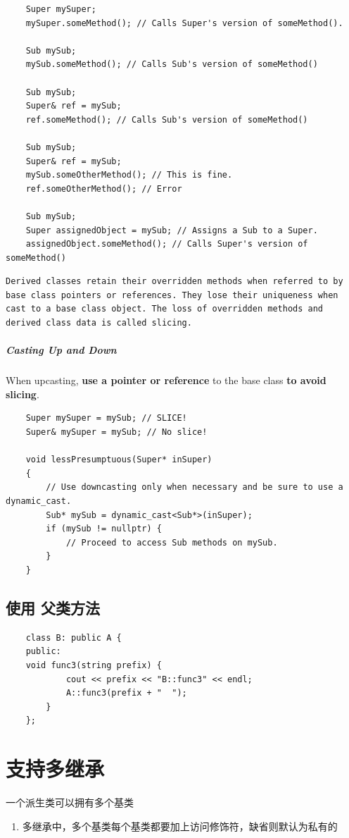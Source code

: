 \documentclass[UTF8,a4paper,12pt]{ctexbook} %
\begin{document}
			\begin{lstlisting}
	Super mySuper;
	mySuper.someMethod(); // Calls Super's version of someMethod().
	
	Sub mySub;
	mySub.someMethod(); // Calls Sub's version of someMethod()
	
	Sub mySub;
	Super& ref = mySub;
	ref.someMethod(); // Calls Sub's version of someMethod()
	
	Sub mySub;
	Super& ref = mySub;
	mySub.someOtherMethod(); // This is fine.
	ref.someOtherMethod(); // Error
	
	Sub mySub;
	Super assignedObject = mySub; // Assigns a Sub to a Super.
	assignedObject.someMethod(); // Calls Super's version of someMethod()
			\end{lstlisting}
			
			\begin{lstlisting}[frame = lTbr]
    Derived classes retain their overridden methods when referred to by base class pointers or references. They lose their uniqueness when cast to a base class object. The loss of overridden methods and derived class data is called slicing.
			\end{lstlisting}
			
			\subparagraph{Casting Up and Down}
				When upcasting, \textbf{use a pointer or reference} to the base class \textbf{to avoid slicing}.
				
			\begin{lstlisting}
	Super mySuper = mySub; // SLICE!
	Super& mySuper = mySub; // No slice!
	
	void lessPresumptuous(Super* inSuper)
	{
		// Use downcasting only when necessary and be sure to use a dynamic_cast.
		Sub* mySub = dynamic_cast<Sub*>(inSuper); 	
		if (mySub != nullptr) {
			// Proceed to access Sub methods on mySub.
		}
	}
			\end{lstlisting}
			
	\subsection{使用 父类方法}	
		\begin{lstlisting}
	class B: public A {
	public:
	void func3(string prefix) {
			cout << prefix << "B::func3" << endl;
			A::func3(prefix + "  ");
		}
	};
		\end{lstlisting}
				
\section{支持多继承}一个派生类可以拥有多个基类
	        \begin{enumerate}[fullwidth,itemindent=2em,label=(\arabic*)]
	          \item 多继承中，多个基类每个基类都要加上访问修饰符，缺省则默认为私有的
	        \end{enumerate}
        
\end{document}
